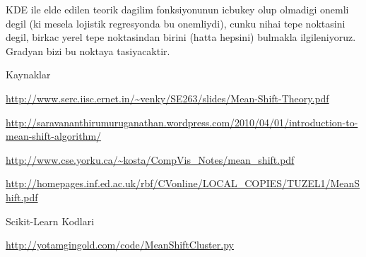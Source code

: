 \documentclass[12pt,fleqn]{article}\usepackage{../common}
\begin{document}
KDE ile elde edilen teorik dagilim fonksiyonunun icbukey olup olmadigi
onemli degil (ki mesela lojistik regresyonda bu onemliydi), cunku
nihai tepe noktasini degil, birkac yerel tepe noktasindan birini
(hatta hepsini) bulmakla ilgileniyoruz. Gradyan bizi bu noktaya
tasiyacaktir.

Kaynaklar

\url{http://www.serc.iisc.ernet.in/~venky/SE263/slides/Mean-Shift-Theory.pdf}

\url{http://saravananthirumuruganathan.wordpress.com/2010/04/01/introduction-to-mean-shift-algorithm/}

\url{http://www.cse.yorku.ca/~kosta/CompVis_Notes/mean_shift.pdf}

\url{http://homepages.inf.ed.ac.uk/rbf/CVonline/LOCAL_COPIES/TUZEL1/MeanShift.pdf}

Scikit-Learn Kodlari

\url{http://yotamgingold.com/code/MeanShiftCluster.py}
\end{document}
